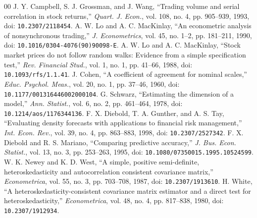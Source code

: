\documentclass[conference]{IEEEtran}
\begin{document}
\begin{thebibliography}{00}
 J. Y. Campbell, S. J. Grossman, and J. Wang, ``Trading volume and serial correlation in stock returns,'' \textit{Quart. J. Econ.}, vol. 108, no. 4, pp. 905--939, 1993, doi: \nolinkurl{10.2307/2118454}.
 A. W. Lo and A. C. MacKinlay, ``An econometric analysis of nonsynchronous trading,'' \textit{J. Econometrics}, vol. 45, no. 1--2, pp. 181--211, 1990, doi: \nolinkurl{10.1016/0304-4076(90)90098-E}.
 A. W. Lo and A. C. MacKinlay, ``Stock market prices do not follow random walks: Evidence from a simple specification test,'' \textit{Rev. Financial Stud.}, vol. 1, no. 1, pp. 41--66, 1988, doi: \nolinkurl{10.1093/rfs/1.1.41}.
 J. Cohen, ``A coefficient of agreement for nominal scales,'' \textit{Educ. Psychol. Meas.}, vol. 20, no. 1, pp. 37--46, 1960, doi: \nolinkurl{10.1177/001316446002000104}.
 G. Schwarz, ``Estimating the dimension of a model,'' \textit{Ann. Statist.}, vol. 6, no. 2, pp. 461--464, 1978, doi: \nolinkurl{10.1214/aos/1176344136}.
 F. X. Diebold, T. A. Gunther, and A. S. Tay, ``Evaluating density forecasts with applications to financial risk management,'' \textit{Int. Econ. Rev.}, vol. 39, no. 4, pp. 863--883, 1998, doi: \nolinkurl{10.2307/2527342}.
 F. X. Diebold and R. S. Mariano, ``Comparing predictive accuracy,'' \textit{J. Bus. Econ. Statist.}, vol. 13, no. 3, pp. 253--263, 1995, doi: \nolinkurl{10.1080/07350015.1995.10524599}.
 W. K. Newey and K. D. West, ``A simple, positive semi-definite, heteroskedasticity and autocorrelation consistent covariance matrix,'' \textit{Econometrica}, vol. 55, no. 3, pp. 703--708, 1987, doi: \nolinkurl{10.2307/1913610}.
 H. White, ``A heteroskedasticity-consistent covariance matrix estimator and a direct test for heteroskedasticity,'' \textit{Econometrica}, vol. 48, no. 4, pp. 817--838, 1980, doi: \nolinkurl{10.2307/1912934}.
\end{thebibliography}
\end{document}
